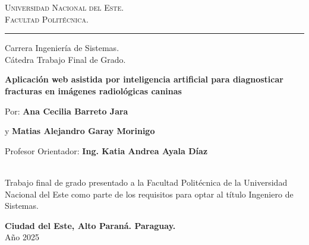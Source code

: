 \vspace*{-3cm}
\begin{figure}[h]
\leavevmode
\begin{minipage}{\textwidth}
\begin{center}
\end{center}
\end{minipage}
\end{figure}

\thispagestyle{empty}

{\bf
\begin{center}
\large
\vspace*{-1 cm}\Large \textsc{Universidad Nacional del Este.} \\
\Large \textsc{Facultad Politécnica.} \\
\vspace*{0.5 cm}\hrule
\vspace*{0.5 cm}\Large Carrera Ingeniería de Sistemas.\\
\vspace*{0 cm}\Large Cátedra Trabajo Final de Grado.\\
\end{center}
}

\vspace{3.5 cm}
{
\noindent
\begin{center}
\huge \bf  Aplicación web asistida por inteligencia artificial para diagnosticar fracturas en imágenes radiológicas caninas
\end{center}

}


\vspace{0.5 cm}
{ 

Por: \textbf{\Large Ana Cecilia Barreto Jara}

y \textbf{\Large Matias Alejandro Garay Morinigo
}


\vspace*{.5 cm}
Profesor Orientador: \textbf{\large  Ing. Katia Andrea Ayala Díaz}

}
\vspace*{0.5 cm}\\
Trabajo final de grado presentado a la Facultad Politécnica de la Universidad Nacional del Este como parte de los requisitos para optar al título Ingeniero de Sistemas.

\vspace{3.0cm}
\begin{center}
{\large {\bf Ciudad del Este, Alto Paraná. Paraguay.}\\[6mm]
Año 2025}
\end{center}

